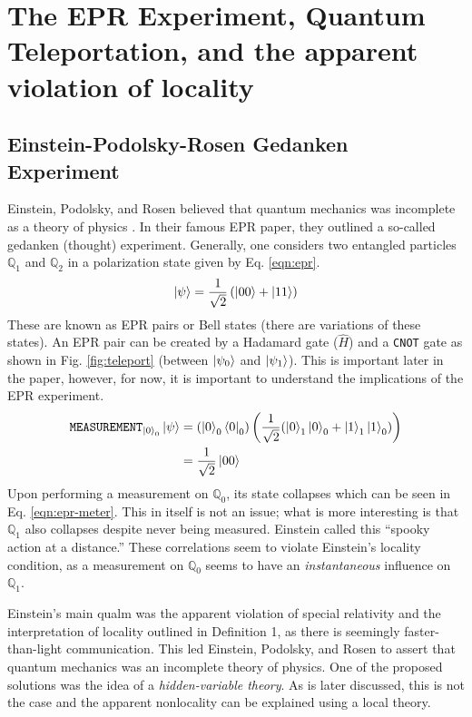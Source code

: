 \documentclass[%
 aip,
cp,  %
 amsmath,amssymb,%
 reprint,%
]{revtex4-2}
\newcommand{\Q}{\mathbb{Q}}
\begin{document}
\section{The EPR Experiment, Quantum Teleportation, and the apparent violation of locality}
\subsection{Einstein-Podolsky-Rosen Gedanken Experiment}

    Einstein, Podolsky, and Rosen believed that quantum mechanics was incomplete as a theory of physics \cite{epr}. In their famous EPR paper, they outlined a so-called gedanken (thought) experiment. Generally, one considers two entangled particles $\Q_1$ and $\Q_2$ in a polarization state given by Eq. \eqref{eqn:epr}.
    \begin{equation} \label{eqn:epr}
        \ket{\psi} = \frac{1}{\sqrt{2}}\left(\ket{00} + \ket{11}\right)
    \end{equation}
    These are known as EPR pairs or Bell states (there are variations of these states). An EPR pair can be created by a Hadamard gate ($\hat{H}$) and a \texttt{CNOT} gate as shown in Fig. \ref{fig:teleport} (between $\ket{\psi_0}$ and $\ket{\psi_1}$). This is important later in the paper, however, for now, it is important to understand the implications of the EPR experiment.  
    \begin{align}
        \texttt{MEASUREMENT}_{\ket{0}_0} \ket{\psi} &= (\ket{0}_0\bra{0}_0)\left(\frac{1}{\sqrt{2}}(\ket{0}_1\ket{0}_0 + \ket{1}_1\ket{1}_0)\right) \\
        &= \frac{1}{\sqrt{2}} \ket{00} \label{eqn:epr-meter}
    \end{align}
    Upon performing a measurement on $\Q_0$, its state collapses which can be seen in Eq. \eqref{eqn:epr-meter}. This in itself is not an issue; what is more interesting is that $\Q_1$ also collapses despite never being measured. Einstein called this ``spooky action at a distance.'' These correlations seem to violate Einstein's locality condition, as a measurement on $\Q_0$ seems to have an \textit{instantaneous} influence on $\Q_1$.
    
    Einstein's main qualm was the apparent violation of special relativity and the interpretation of locality outlined in Definition 1, as there is seemingly faster-than-light communication. This led Einstein, Podolsky, and Rosen to assert that quantum mechanics was an incomplete theory of physics. One of the proposed solutions was the idea of a \textit{hidden-variable theory}. As is later discussed, this is not the case and the apparent nonlocality can be explained using a local theory.  
\end{document}
